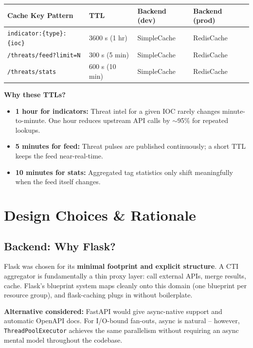 \documentclass[11pt,a4paper]{article}
\begin{document}
\begin{center}
\begin{tabular}{llll}
\toprule
\textbf{Cache Key Pattern} & \textbf{TTL} & \textbf{Backend (dev)} & \textbf{Backend (prod)} \\
\midrule
\texttt{indicator:\{type\}:\{ioc\}} & 3600 s (1 hr) & SimpleCache & RedisCache \\
\texttt{/threats/feed?limit=N}      & 300 s (5 min) & SimpleCache & RedisCache \\
\texttt{/threats/stats}             & 600 s (10 min) & SimpleCache & RedisCache \\
\bottomrule
\end{tabular}
\end{center}

\textbf{Why these TTLs?}
\begin{itemize}
  \item \textbf{1 hour for indicators:} Threat intel for a given IOC rarely changes minute-to-minute. One hour reduces upstream API calls by $\sim$95\% for repeated lookups.
  \item \textbf{5 minutes for feed:} Threat pulses are published continuously; a short TTL keeps the feed near-real-time.
  \item \textbf{10 minutes for stats:} Aggregated tag statistics only shift meaningfully when the feed itself changes.
\end{itemize}

\newpage

\section{Design Choices \& Rationale}

\subsection{Backend: Why Flask?}

\begin{greenbox}
Flask was chosen for its \textbf{minimal footprint and explicit structure}. A CTI aggregator is fundamentally a thin proxy layer: call external APIs, merge results, cache. Flask's blueprint system maps cleanly onto this domain (one blueprint per resource group), and flask-caching plugs in without boilerplate.
\end{greenbox}

\textbf{Alternative considered:} FastAPI would give async-native support and automatic OpenAPI docs. For I/O-bound fan-outs, async is natural -- however, \texttt{ThreadPoolExecutor} achieves the same parallelism without requiring an async mental model throughout the codebase.
\end{document}
